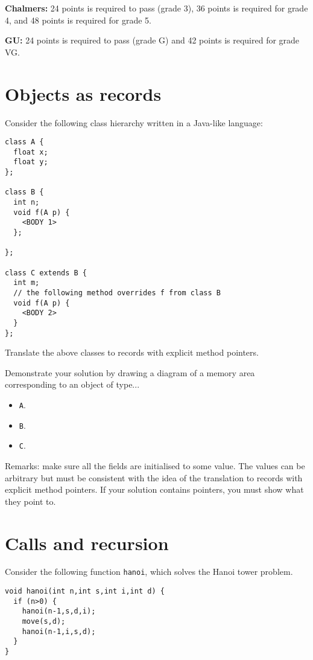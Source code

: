 \documentclass{article}
\begin{document}
\textbf{Chalmers:}
24 points is required to pass (grade 3), 36 points is required for
grade 4, and 48 points is required for grade 5.

\textbf{GU:}
24 points is required to pass (grade G) and 42 points is
required for grade VG.

\section{Objects as records}

Consider the following class hierarchy written in a Java-like
language:
\begin{verbatim}
class A {
  float x;
  float y;
};

class B {
  int n;
  void f(A p) {
    <BODY 1>
  };

};

class C extends B {
  int m;
  // the following method overrides f from class B
  void f(A p) { 
    <BODY 2>
  }
};
\end{verbatim}

Translate the above classes to records with explicit method pointers.

Demonstrate your solution by drawing a diagram of a memory area
corresponding to an object of type...
\begin{itemize}
\item \texttt A. 
\item \texttt B. 
\item \texttt C. 
\end{itemize}
Remarks: make sure all the fields are initialised to some value. The
values can be arbitrary but must be consistent with the idea of the
translation to records with explicit method pointers. If your solution
contains pointers, you must show what they point to.
\newpage
\section{Calls and recursion}

Consider the following function \texttt{hanoi},
which solves the Hanoi tower problem.

\begin{verbatim}
void hanoi(int n,int s,int i,int d) {
  if (n>0) {
    hanoi(n-1,s,d,i);
    move(s,d);
    hanoi(n-1,i,s,d);
  }
}
\end{verbatim}
\end{document}
